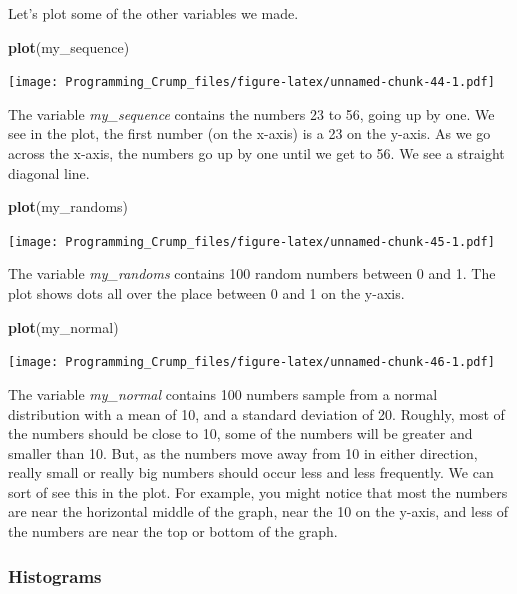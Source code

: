 \documentclass[]{book}
\newenvironment{Shaded}{\begin{snugshade}}{\end{snugshade}}
\newcommand{\KeywordTok}[1]{\textcolor[rgb]{0.13,0.29,0.53}{\textbf{{#1}}}}
\newcommand{\NormalTok}[1]{{#1}}
\theoremstyle{definition}
\theoremstyle{definition}
\theoremstyle{definition}
\theoremstyle{remark}
\begin{document}
Let's plot some of the other variables we made.

\begin{Shaded}
\begin{Highlighting}[]
\KeywordTok{plot}\NormalTok{(my_sequence)}
\end{Highlighting}
\end{Shaded}

\texttt{[image: Programming\_Crump\_files/figure-latex/unnamed-chunk-44-1.pdf]}

The variable \emph{my\_sequence} contains the numbers 23 to 56, going up
by one. We see in the plot, the first number (on the x-axis) is a 23 on
the y-axis. As we go across the x-axis, the numbers go up by one until
we get to 56. We see a straight diagonal line.

\begin{Shaded}
\begin{Highlighting}[]
\KeywordTok{plot}\NormalTok{(my_randoms)}
\end{Highlighting}
\end{Shaded}

\texttt{[image: Programming\_Crump\_files/figure-latex/unnamed-chunk-45-1.pdf]}

The variable \emph{my\_randoms} contains 100 random numbers between 0
and 1. The plot shows dots all over the place between 0 and 1 on the
y-axis.

\begin{Shaded}
\begin{Highlighting}[]
\KeywordTok{plot}\NormalTok{(my_normal)}
\end{Highlighting}
\end{Shaded}

\texttt{[image: Programming\_Crump\_files/figure-latex/unnamed-chunk-46-1.pdf]}

The variable \emph{my\_normal} contains 100 numbers sample from a normal
distribution with a mean of 10, and a standard deviation of 20. Roughly,
most of the numbers should be close to 10, some of the numbers will be
greater and smaller than 10. But, as the numbers move away from 10 in
either direction, really small or really big numbers should occur less
and less frequently. We can sort of see this in the plot. For example,
you might notice that most the numbers are near the horizontal middle of
the graph, near the 10 on the y-axis, and less of the numbers are near
the top or bottom of the graph.

\subsubsection{Histograms}\label{histograms}
\end{document}
